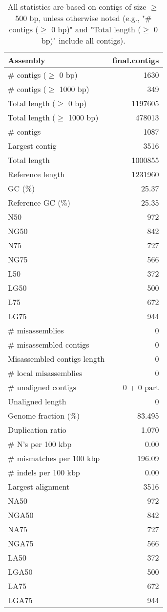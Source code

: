 \documentclass[12pt,a4paper]{article}
\begin{document}
\begin{table}[ht]
\begin{center}
\caption{All statistics are based on contigs of size $\geq$ 500 bp, unless otherwise noted (e.g., "\# contigs ($\geq$ 0 bp)" and "Total length ($\geq$ 0 bp)" include all contigs).}
\begin{tabular}{|l*{1}{|r}|}
\hline
Assembly & final.contigs \\ \hline
\# contigs ($\geq$ 0 bp) & 1630 \\ \hline
\# contigs ($\geq$ 1000 bp) & 349 \\ \hline
Total length ($\geq$ 0 bp) & 1197605 \\ \hline
Total length ($\geq$ 1000 bp) & 478013 \\ \hline
\# contigs & 1087 \\ \hline
Largest contig & 3516 \\ \hline
Total length & 1000855 \\ \hline
Reference length & 1231960 \\ \hline
GC (\%) & 25.37 \\ \hline
Reference GC (\%) & 25.35 \\ \hline
N50 & 972 \\ \hline
NG50 & 842 \\ \hline
N75 & 727 \\ \hline
NG75 & 566 \\ \hline
L50 & 372 \\ \hline
LG50 & 500 \\ \hline
L75 & 672 \\ \hline
LG75 & 944 \\ \hline
\# misassemblies & 0 \\ \hline
\# misassembled contigs & 0 \\ \hline
Misassembled contigs length & 0 \\ \hline
\# local misassemblies & 0 \\ \hline
\# unaligned contigs & 0 + 0 part \\ \hline
Unaligned length & 0 \\ \hline
Genome fraction (\%) & 83.495 \\ \hline
Duplication ratio & 1.070 \\ \hline
\# N's per 100 kbp & 0.00 \\ \hline
\# mismatches per 100 kbp & 196.09 \\ \hline
\# indels per 100 kbp & 0.00 \\ \hline
Largest alignment & 3516 \\ \hline
NA50 & 972 \\ \hline
NGA50 & 842 \\ \hline
NA75 & 727 \\ \hline
NGA75 & 566 \\ \hline
LA50 & 372 \\ \hline
LGA50 & 500 \\ \hline
LA75 & 672 \\ \hline
LGA75 & 944 \\ \hline
\end{tabular}
\end{center}
\end{table}
\end{document}
